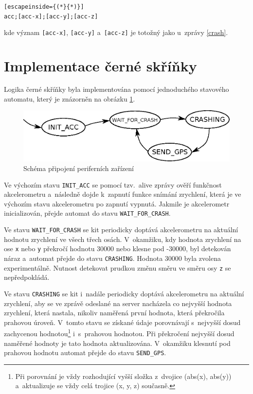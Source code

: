 \documentclass[a4paper,11pt,titlepage]{article}
\begin{document}
\begin{lstlisting}[escapeinside={(*}{*)}]
acc;[acc-x];[acc-y];[acc-z]
\end{lstlisting}

kde význam \texttt{[acc-x]}, \texttt{[acc-y]} a~\texttt{[acc-z]} je totožný jako u~zprávy \ref{crash}.

\section{Implementace černé skříňky}

Logika černé skříňky byla implementována pomocí jednoduchého stavového automatu,
který je znázorněn na obrázku \ref{automata}.



\begin{figure}[h]
\centering
\includegraphics[scale=0.7]{img/automata.eps}
\caption{Schéma připojení periferních zařízení}\label{automata}\end{figure}



Ve výchozím stavu \texttt{INIT\_ACC} se pomocí tzv.~alive zprávy ověří funkčnost akcelerometru
a~následně dojde k~zapnutí funkce snímání zrychlení, která je ve výchozím stavu akcelerometru
po zapnutí vypnutá. Jakmile je akcelerometr inicializován, přejde automat do stavu \texttt{WAIT\_FOR\_CRASH}.

Ve stavu \texttt{WAIT\_FOR\_CRASH} se kit periodicky doptává akcelerometru na aktuální hodnotu
zrychlení ve všech třech osách. V~okamžiku, kdy hodnota zrychlení na ose \texttt{x} nebo \texttt{y}
překročí hodnotu 30000 nebo klesne pod -30000, byl detekován náraz a~automat přejde do stavu
\texttt{CRASHING}. Hodnota 30000 byla zvolena experimentálně. Nutnost detekovat
prudkou změnu směru ve směru osy \texttt{z} se nepředpokládá.

Ve stavu \texttt{CRASHING} se kit i~nadále periodicky doptává akcelerometru na aktuální zrychlení,
aby se ve zprávě odeslané na server nacházela co nejvyšší hodnota zrychlení, která
nastala, nikoliv naměřená první hodnota, která překročila prahovou úroveň.
V~tomto stavu se získané údaje porovnávají s~nejvyšší dosud zachycenou hodnotou\footnote{Při porovnání je vždy rozhodující vyšší složka z~dvojice (abs(x), abs(y))
    a~aktualizuje se vždy celá trojice (x, y, z) současně.}
i~s~prahovou hodnotou. Při překročení nejvyšší dosud naměřené hodnoty je tato hodnota
aktualizována. V~okamžiku klesnutí pod prahovou hodnotu automat přejde
do stavu \texttt{SEND\_GPS}.
\end{document}
